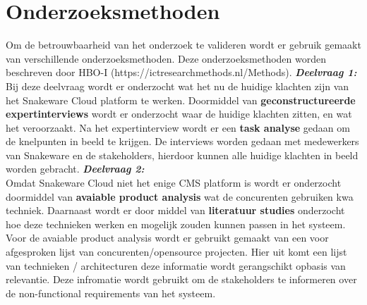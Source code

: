 
\section{Onderzoeksmethoden}
Om de betrouwbaarheid van het onderzoek te valideren wordt er gebruik gemaakt van verschillende onderzoeksmethoden.
Deze onderzoeksmethoden worden beschreven door HBO-I (https://ictresearchmethods.nl/Methods). 
\whitespace
\textit{\textbf{Deelvraag 1:} \SubquestionOne} \\
Bij deze deelvraag wordt er onderzocht wat het nu de huidige klachten zijn van het Snakeware Cloud platform te werken.
Doormiddel van \textbf{geconstructureerde expertinterviews} wordt er onderzocht waar de huidige klachten zitten, en wat het veroorzaakt.
Na het expertinterview wordt er een \textbf{task analyse} gedaan om de knelpunten in beeld te krijgen.
De interviews worden gedaan met medewerkers van Snakeware en de stakeholders, hierdoor kunnen alle huidige klachten in beeld worden gebracht.
\whitespace
\textit{\textbf{Deelvraag 2:} \SubquestionTwo} \\
Omdat Snakeware Cloud niet het enige CMS platform is wordt er onderzocht doormiddel van \textbf{avaiable product analysis} wat de concurenten gebruiken kwa techniek.
Daarnaast wordt er door middel van \textbf{literatuur studies} onderzocht hoe deze technieken werken en mogelijk zouden kunnen passen in het systeem.
Voor de avaiable product analysis wordt er gebruikt gemaakt van een voor afgesproken lijst van concurenten/opensource projecten.
Hier uit komt een lijst van technieken / architecturen deze informatie wordt gerangschikt opbasis van relevantie.
Deze infromatie wordt gebruikt om de stakeholders te informeren over de non-functional requirements van het systeem.
